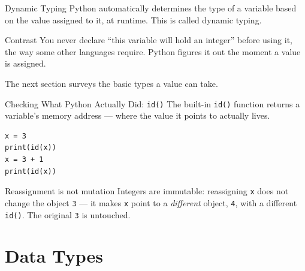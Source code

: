 \documentclass[9pt,aspectratio=169,xcolor=table]{beamer}
\begin{document}
\begin{frame}{Dynamic Typing}
    \leavevmode
    Python automatically determines the type of a variable based on the
    value assigned to it, \alert{at runtime}. This is called
    \alert{dynamic typing}.

    \vspace{3mm}
    \begin{block}{Contrast}
        \small You never declare ``this variable will hold an integer''
        before using it, the way some other languages require. Python
        figures it out the moment a value is assigned.
    \end{block}

    \vspace{3mm}
    {\small The next section surveys the basic types a value can take.}
\end{frame}

\begin{frame}[fragile]{Checking What Python Actually Did: \texttt{id()}}
    \leavevmode
    The built-in \texttt{id()} function returns a variable's
    \alert{memory address} --- where the value it points to actually
    lives.

\begin{lstlisting}
x = 3
print(id(x))
x = 3 + 1
print(id(x))
\end{lstlisting}

    \vspace{2mm}
    \begin{block}{Reassignment is not mutation}
        \small Integers are \alert{immutable}: reassigning \texttt{x}
        does not change the object \texttt{3} --- it makes \texttt{x}
        point to a \emph{different} object, \texttt{4}, with a different
        \texttt{id()}. The original \texttt{3} is untouched.
    \end{block}
\end{frame}

\section{Data Types}
\end{document}
